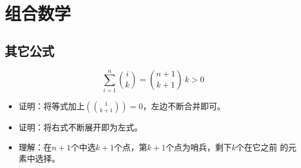 \chapter{组合数学}



\section{其它公式}
\begin{theorem}
    \begin{displaymath}
        \sum_{i=1}^n{i \choose k}={n+1 \choose k+1} ~k>0
    \end{displaymath}
\end{theorem}
\begin{itemize}
    \item 证明：将等式加上$(1\choose k+1)=0$，左边不断合并即可。
    \item 证明：将右式不断展开即为左式。
    \item 理解：在$n+1$个中选$k+1$个点，第$k+1$个点为哨兵，剩下$k$个在它之前
    的元素中选择。
\end{itemize}

